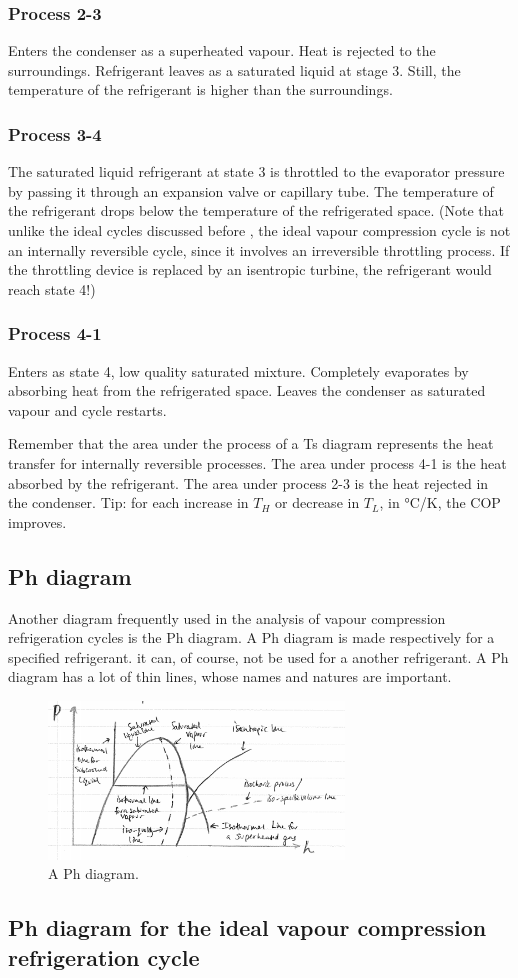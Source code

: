 \documentclass[class=report, crop=false, 12pt,a4paper]{standalone}
\begin{document}
\subsubsection{Process 2-3}
Enters the condenser as a superheated vapour. Heat is rejected to the surroundings. Refrigerant leaves as a saturated liquid at stage 3. Still, the temperature of the refrigerant is higher than the surroundings. 
\subsubsection{Process 3-4}
The saturated liquid refrigerant at state 3 is throttled to the evaporator pressure by passing it through an expansion valve or capillary tube. The temperature of the refrigerant drops below the temperature of the refrigerated space. (Note that unlike the ideal cycles discussed before , the ideal vapour compression cycle is not an internally reversible cycle, since it involves an irreversible throttling process. If the throttling device is replaced by an isentropic turbine, the refrigerant would reach state 4!)
\subsubsection{Process 4-1}
Enters as state 4, low quality saturated mixture. Completely evaporates by absorbing heat from the refrigerated space. Leaves the condenser as saturated vapour and cycle restarts.

Remember that the area under the process of a Ts diagram represents the heat transfer for internally reversible processes. The area under process 4-1 is the heat absorbed by the refrigerant. The area under process 2-3 is the heat rejected in the condenser. Tip: for each increase in $T_H$ or decrease in $T_L$, in \si{\celsius}/\si{\kelvin}, the COP improves.
\subsection{Ph diagram}
Another diagram frequently used in the analysis of vapour compression refrigeration cycles is the Ph diagram. A Ph diagram is made respectively for a specified refrigerant. it can, of course, not be used for a another refrigerant. A Ph diagram has a lot of thin lines, whose names and natures are important. 
\begin{figure}
  \centering
  \includegraphics[width = 0.7\textwidth]{../img/PhDiagram}
  \caption{A Ph diagram.}
\end{figure}
\subsection{Ph diagram for the ideal vapour compression refrigeration cycle}
\end{document}
